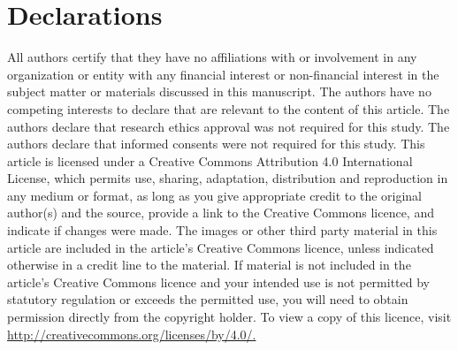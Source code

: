 \documentclass[pdflatex,sn-mathphys-num]{sn-jnl}
\numberwithin{equation}{section}%
\theoremstyle{thmstyleone}%
\theoremstyle{thmstyletwo}%
\theoremstyle{thmstylethree}%
\begin{document}
\section*{Declarations}




 All authors certify that they have no affiliations with or involvement in any organization or entity with any financial interest or non-financial interest in the subject matter or materials discussed in this manuscript. The authors have no competing interests to declare that are relevant to the content of this article.
 The authors declare that research ethics approval was not required for this study.
 The authors declare that informed consents were not required for this study.
 This article is licensed under a Creative Commons Attribution 4.0 International License, which permits use, sharing, adaptation, distribution and reproduction in any medium or format, as long as you give appropriate credit to the original author(s) and the source, provide a link to the Creative Commons licence, and indicate if changes were made. The images or other third party material in this article are included in the article’s Creative Commons licence, unless indicated otherwise in a credit line to the material. If material is not included in the article’s Creative Commons licence and your intended use is not permitted by statutory regulation or exceeds the permitted use, you will need to obtain permission directly from the copyright holder. To view a copy of this licence, visit \url{http://creativecommons.org/licenses/by/4.0/.}
\end{document}
